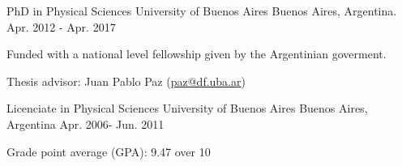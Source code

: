 
\begin{cventries}

  \cventry
    {PhD in Physical Sciences} %
    {University of Buenos Aires} %
    {Buenos Aires, Argentina.} %
    {Apr. 2012 - Apr. 2017} %
    {
      \begin{cvitems} %
        \item {Funded with a national level fellowship given by the Argentinian
            goverment.}
        \item {Thesis advisor: Juan Pablo Paz (\href{mailto:paz@df.uba.ar}{paz@df.uba.ar})}
      \end{cvitems}
    }

  \cventry
    {Licenciate in Physical Sciences} %
    {University of Buenos Aires} %
    {Buenos Aires, Argentina} %
    {Apr. 2006- Jun. 2011} %
    {
      \begin{cvitems} %
        \item {Grade point average (GPA): 9.47 over 10}
      \end{cvitems}
    }



\end{cventries}
